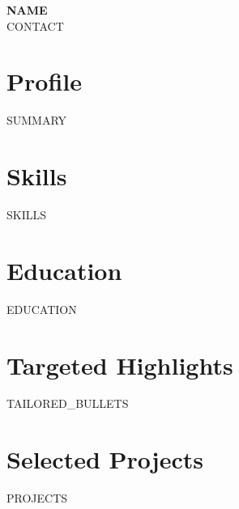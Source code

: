 \documentclass[10pt,letterpaper]{article}
\begin{document}
{\LARGE \textbf{{{NAME}}}}\\
{{CONTACT}}

\section*{Profile}
{{SUMMARY}}

\section*{Skills}
{{SKILLS}}

\section*{Education}
{{EDUCATION}}

\section*{Targeted Highlights}
\begin{itemize}
{{TAILORED_BULLETS}}
\end{itemize}

\section*{Selected Projects}
{{PROJECTS}}
\end{document}

